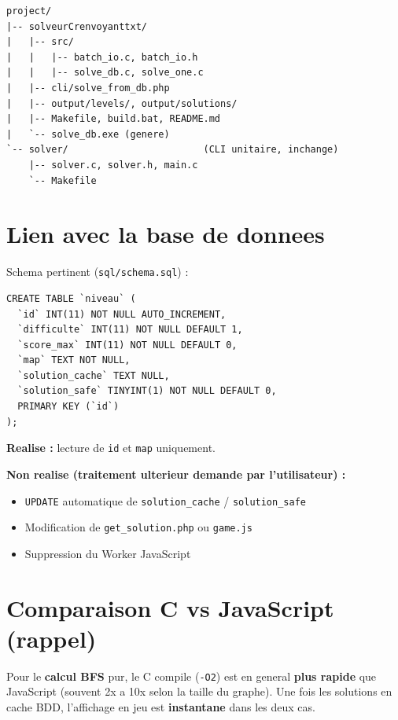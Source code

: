 \documentclass[11pt,a4paper]{article}
\begin{document}
\begin{lstlisting}[style=kllisting]
project/
|-- solveurCrenvoyanttxt/
|   |-- src/
|   |   |-- batch_io.c, batch_io.h
|   |   |-- solve_db.c, solve_one.c
|   |-- cli/solve_from_db.php
|   |-- output/levels/, output/solutions/
|   |-- Makefile, build.bat, README.md
|   `-- solve_db.exe (genere)
`-- solver/                        (CLI unitaire, inchange)
    |-- solver.c, solver.h, main.c
    `-- Makefile
\end{lstlisting}

\section{Lien avec la base de donnees}

Schema pertinent (\texttt{sql/schema.sql}) :

\begin{lstlisting}[style=kllisting]
CREATE TABLE `niveau` (
  `id` INT(11) NOT NULL AUTO_INCREMENT,
  `difficulte` INT(11) NOT NULL DEFAULT 1,
  `score_max` INT(11) NOT NULL DEFAULT 0,
  `map` TEXT NOT NULL,
  `solution_cache` TEXT NULL,
  `solution_safe` TINYINT(1) NOT NULL DEFAULT 0,
  PRIMARY KEY (`id`)
);
\end{lstlisting}

\textbf{Realise :} lecture de \texttt{id} et \texttt{map} uniquement.

\textbf{Non realise (traitement ulterieur demande par l'utilisateur) :}
\begin{itemize}
    \item \texttt{UPDATE} automatique de \texttt{solution\_cache} / \texttt{solution\_safe}
    \item Modification de \texttt{get\_solution.php} ou \texttt{game.js}
    \item Suppression du Worker JavaScript
\end{itemize}

\section{Comparaison C vs JavaScript (rappel)}

Pour le \textbf{calcul BFS} pur, le C compile (\texttt{-O2}) est en general \textbf{plus rapide} que JavaScript (souvent 2x a 10x selon la taille du graphe). Une fois les solutions en cache BDD, l'affichage en jeu est \textbf{instantane} dans les deux cas.
\end{document}
